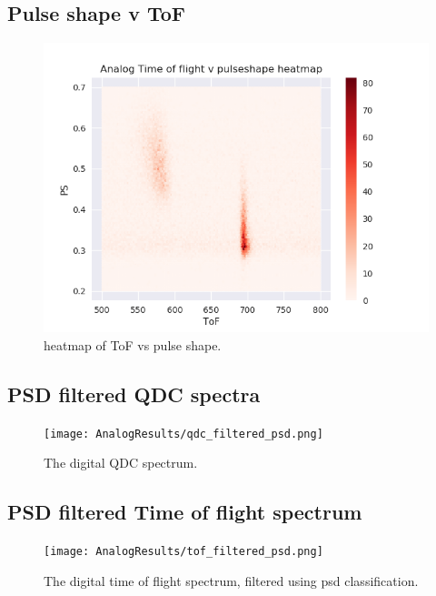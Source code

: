 \documentclass[main.tex]{subfiles}
\begin{document}
\subsection{Pulse shape v ToF}
\begin{figure}[ht]
    \centering
        \includegraphics[scale=.85]{AnalogResults/ps_tof.png}
        \caption{heatmap of ToF vs pulse shape.}
    \label{fig:tof_ps_a} 
\end{figure}

\newpage
\subsection{PSD filtered QDC spectra}
\begin{figure}[ht]
    \centering
        \texttt{[image: AnalogResults/qdc\_filtered\_psd.png]}
        \caption{The digital QDC spectrum.}
    \label{fig:D_QDC}
\end{figure}

\newpage
\subsection{PSD filtered Time of flight spectrum}
\begin{figure}[ht!]
    \centering
        \texttt{[image: AnalogResults/tof\_filtered\_psd.png]}
        \caption{The digital time of flight spectrum, filtered using psd classification.}
    \label{fig:D_PSD_TOF} 
\end{figure}
\end{document}
